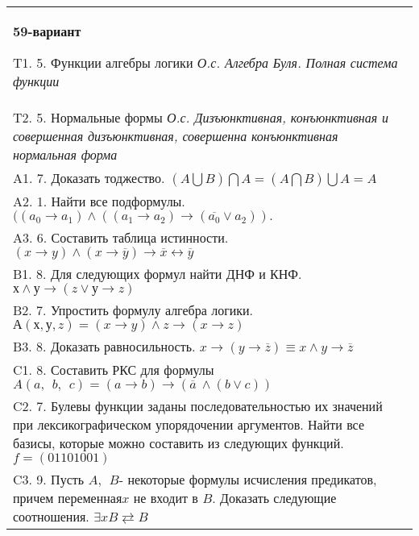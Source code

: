 \documentclass{article}
\begin{document}
\begin{tabular}{m{17cm}}
\textbf{59-вариант}
\newline

T1. 5. Функции алгебры логики \emph{О.с. Алгебра Буля. Полная система функции} \\
T2. 5. Нормальные формы \emph{О.с. Дизъюнктивная, конъюнктивная и совершенная дизъюнктивная, совершенна конъюнктивная нормальная форма} \\
A1. 7. Доказать тоджество. \((A\bigcup B)\bigcap A = (A\bigcap B)\bigcup A = A\) \\
A2. 1. Найти все подформулы. \(((a_{0} \rightarrow a_{1}) \land ((a_{1} \rightarrow a_{2}) \rightarrow (\overline{a_{0}} \vee a_{2})).\) \\
A3. 6. Составить таблица истинности. \((x \rightarrow y) \land (x \rightarrow \overline{y}) \rightarrow \overline{x} \leftrightarrow \overline{y}\) \\
B1. 8. Для следующих формул найти ДНФ и КНФ. \(х \land у \rightarrow (z \vee у \rightarrow z)\) \\
B2. 7. Упростить формулу алгебра логики. \(А(х,у,z) = (x \rightarrow y) \land z \rightarrow (x \rightarrow z)\) \\
B3. 8. Доказать равносильность. \(x \rightarrow \left( y \rightarrow \overline{z} \right) \equiv x \land y \rightarrow \overline{z}\) \\
C1. 8. Составить РКС для формулы \(A(a,\ \ b,\ \ c) = (a \rightarrow b) \rightarrow (\overline{a}\  \land (b \vee c))\) \\
C2. 7. Булевы функции заданы последовательностью их значений при лексикографическом упорядочении аргументов. Найти все базисы, которые можно составить из следующих функций. \(f = (01101001)\) \\
C3. 9. Пусть \(A,\ \ B\)- некоторые формулы исчисления предикатов, причем переменная\(x\) не входит в \(B\). Доказать следующие соотношения. \(\exists xB \rightleftarrows B\)
 \\

\end{tabular}
\vspace{1cm}
\end{document}
